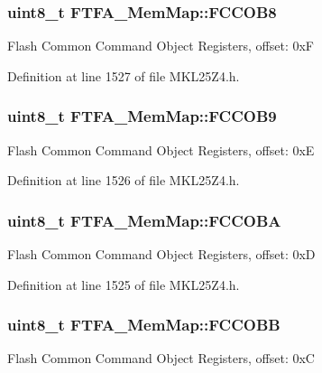 \subsubsection[{\texorpdfstring{F\+C\+C\+O\+B8}{FCCOB8}}]{\setlength{\rightskip}{0pt plus 5cm}uint8\+\_\+t F\+T\+F\+A\+\_\+\+Mem\+Map\+::\+F\+C\+C\+O\+B8}\hypertarget{struct_f_t_f_a___mem_map_a4827886fc87b827ebb288972ff05f5c3}{}\label{struct_f_t_f_a___mem_map_a4827886fc87b827ebb288972ff05f5c3}
Flash Common Command Object Registers, offset\+: 0xF 

Definition at line 1527 of file M\+K\+L25\+Z4.\+h.

\subsubsection[{\texorpdfstring{F\+C\+C\+O\+B9}{FCCOB9}}]{\setlength{\rightskip}{0pt plus 5cm}uint8\+\_\+t F\+T\+F\+A\+\_\+\+Mem\+Map\+::\+F\+C\+C\+O\+B9}\hypertarget{struct_f_t_f_a___mem_map_ad58eb2c520219ec46caa68d6556dc479}{}\label{struct_f_t_f_a___mem_map_ad58eb2c520219ec46caa68d6556dc479}
Flash Common Command Object Registers, offset\+: 0xE 

Definition at line 1526 of file M\+K\+L25\+Z4.\+h.

\subsubsection[{\texorpdfstring{F\+C\+C\+O\+BA}{FCCOBA}}]{\setlength{\rightskip}{0pt plus 5cm}uint8\+\_\+t F\+T\+F\+A\+\_\+\+Mem\+Map\+::\+F\+C\+C\+O\+BA}\hypertarget{struct_f_t_f_a___mem_map_ab167db24e2f5b86e4498c713331b41fc}{}\label{struct_f_t_f_a___mem_map_ab167db24e2f5b86e4498c713331b41fc}
Flash Common Command Object Registers, offset\+: 0xD 

Definition at line 1525 of file M\+K\+L25\+Z4.\+h.

\subsubsection[{\texorpdfstring{F\+C\+C\+O\+BB}{FCCOBB}}]{\setlength{\rightskip}{0pt plus 5cm}uint8\+\_\+t F\+T\+F\+A\+\_\+\+Mem\+Map\+::\+F\+C\+C\+O\+BB}\hypertarget{struct_f_t_f_a___mem_map_a4492c1b3ac2ecf8e5ce1d046d2a5e149}{}\label{struct_f_t_f_a___mem_map_a4492c1b3ac2ecf8e5ce1d046d2a5e149}
Flash Common Command Object Registers, offset\+: 0xC 

